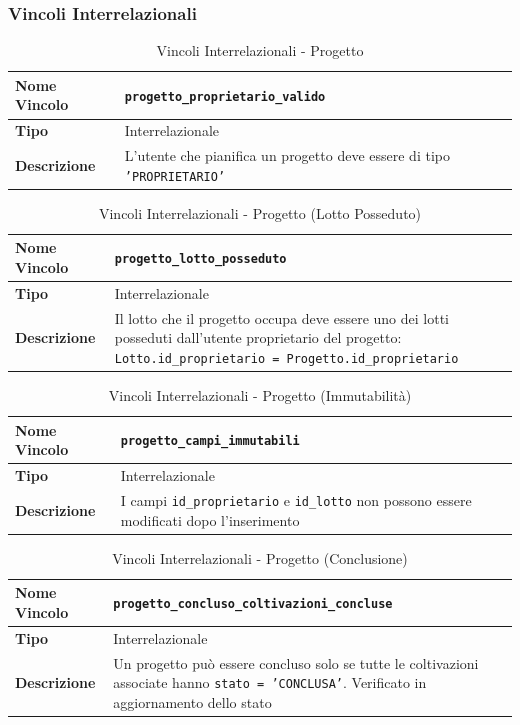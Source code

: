 \documentclass[12pt,a4paper]{article}
\begin{document}
\subsubsection{Vincoli Interrelazionali}

\begin{table}[H]
\centering
\caption{Vincoli Interrelazionali - Progetto}
\begin{tabularx}{\textwidth}{|l|X|}
\hline
\textbf{Nome Vincolo} & \texttt{progetto\_proprietario\_valido} \\
\hline
\textbf{Tipo} & Interrelazionale \\
\hline
\textbf{Descrizione} & L'utente che pianifica un progetto deve essere di tipo \texttt{'PROPRIETARIO'} \\
\hline
\end{tabularx}
\end{table}

\begin{table}[H]
\centering
\caption{Vincoli Interrelazionali - Progetto (Lotto Posseduto)}
\begin{tabularx}{\textwidth}{|l|X|}
\hline
\textbf{Nome Vincolo} & \texttt{progetto\_lotto\_posseduto} \\
\hline
\textbf{Tipo} & Interrelazionale \\
\hline
\textbf{Descrizione} & Il lotto che il progetto occupa deve essere uno dei lotti posseduti dall'utente proprietario del progetto: \texttt{Lotto.id\_proprietario = Progetto.id\_proprietario} \\
\hline
\end{tabularx}
\end{table}

\begin{table}[H]
\centering
\caption{Vincoli Interrelazionali - Progetto (Immutabilità)}
\begin{tabularx}{\textwidth}{|l|X|}
\hline
\textbf{Nome Vincolo} & \texttt{progetto\_campi\_immutabili} \\
\hline
\textbf{Tipo} & Interrelazionale \\
\hline
\textbf{Descrizione} & I campi \texttt{id\_proprietario} e \texttt{id\_lotto} non possono essere modificati dopo l'inserimento \\
\hline
\end{tabularx}
\end{table}

\begin{table}[H]
\centering
\caption{Vincoli Interrelazionali - Progetto (Conclusione)}
\begin{tabularx}{\textwidth}{|l|X|}
\hline
\textbf{Nome Vincolo} & \texttt{progetto\_concluso\_coltivazioni\_concluse} \\
\hline
\textbf{Tipo} & Interrelazionale \\
\hline
\textbf{Descrizione} & Un progetto può essere concluso solo se tutte le coltivazioni associate hanno \texttt{stato = 'CONCLUSA'}. Verificato in aggiornamento dello stato \\
\hline
\end{tabularx}
\end{table}
\end{document}
